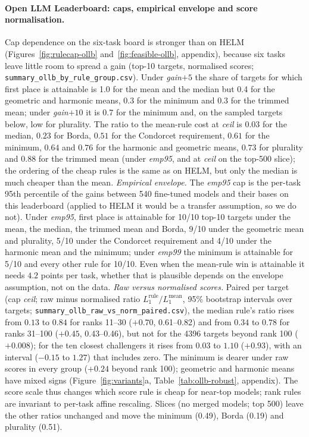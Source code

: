 \paragraph{Open LLM Leaderboard: caps, empirical envelope and score normalisation.}
Cap dependence on the six-task board is stronger than on HELM (Figures~\ref{fig:rulecap-ollb} and~\ref{fig:feasible-ollb}, appendix), because six tasks leave little room to spread a gain (top-10 targets, normalised scores; \texttt{summary\_ollb\_by\_rule\_group.csv}). Under \emph{gain}$+5$ the share of targets for which first place is attainable is 1.0 for the mean and the median but 0.4 for the geometric and harmonic means, 0.3 for the minimum and 0.3 for the trimmed mean; under \emph{gain}$+10$ it is 0.7 for the minimum and, on the sampled targets below, low for plurality. The ratio to the mean-rule cost at \emph{ceil} is $0.03$ for the median, $0.23$ for Borda, $0.51$ for the Condorcet requirement, $0.61$ for the minimum, $0.64$ and $0.76$ for the harmonic and geometric means, $0.73$ for plurality and $0.88$ for the trimmed mean (under \emph{emp95}, and at \emph{ceil} on the top-500 slice); the ordering of the cheap rules is the same as on HELM, but only the median is much cheaper than the mean. \emph{Empirical envelope.} The \emph{emp95} cap is the per-task 95th percentile of the gains between 540 fine-tuned models and their bases on this leaderboard (applied to HELM it would be a transfer assumption, so we do not). Under \emph{emp95}, first place is attainable for 10/10 top-10 targets under the mean, the median, the trimmed mean and Borda, 9/10 under the geometric mean and plurality, 5/10 under the Condorcet requirement and 4/10 under the harmonic mean and the minimum; under \emph{emp99} the minimum is attainable for 5/10 and every other rule for 10/10. Even when the mean-rule win is attainable it needs $4.2$ points per task, whether that is plausible depends on the envelope assumption, not on the data. \emph{Raw versus normalised scores.} Paired per target (cap \emph{ceil}; raw minus normalised ratio $L_1^{\mathrm{rule}}/L_1^{\mathrm{mean}}$, 95\% bootstrap intervals over targets; \texttt{summary\_ollb\_raw\_vs\_norm\_paired.csv}), the median rule's ratio rises from $0.13$ to $0.84$ for ranks 11--30 ($+0.70$, 0.61--0.82) and from $0.34$ to $0.78$ for ranks 31--100 ($+0.45$, 0.43--0.46), but not for the 4396 targets beyond rank 100 ($+0.008$); for the ten closest challengers it rises from $0.03$ to $1.10$ ($+0.93$), with an interval ($-0.15$ to $1.27$) that includes zero. The minimum is dearer under raw scores in every group ($+0.24$ beyond rank 100); geometric and harmonic means have mixed signs (Figure~\ref{fig:variants}a, Table~\ref{tab:ollb-robust}, appendix). The score scale thus changes which score rule is cheap for near-top models; rank rules are invariant to per-task affine rescaling. Slices (no merged models; top 500) leave the other ratios unchanged and move the minimum (0.49), Borda (0.19) and plurality (0.51).


